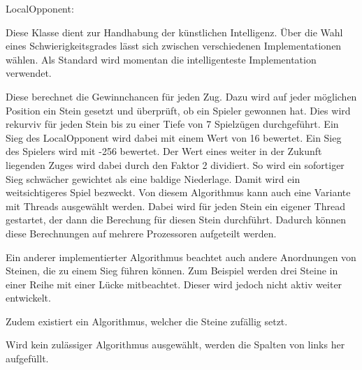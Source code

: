 LocalOpponent:

Diese Klasse dient zur Handhabung der künstlichen 
Intelligenz. Über die Wahl eines
Schwierigkeitsgrades lässt sich zwischen 
verschiedenen Implementationen wählen. Als Standard
wird momentan die intelligenteste Implementation 
verwendet.

Diese berechnet die Gewinnchancen für jeden Zug. 
Dazu wird auf jeder möglichen Position ein Stein
gesetzt und überprüft, ob ein Spieler gewonnen hat. 
Dies wird rekurviv für jeden Stein bis zu einer Tiefe 
von 7 Spielzügen durchgeführt. 
Ein Sieg des LocalOpponent wird dabei mit einem Wert 
von 16 bewertet. Ein Sieg des Spielers wird mit -256 
bewertet. 
Der Wert eines weiter in der Zukunft liegenden Zuges 
wird dabei durch den Faktor 2 dividiert. 
So wird ein sofortiger Sieg schwächer gewichtet als 
eine baldige Niederlage. Damit wird ein weitsichtigeres 
Spiel bezweckt. 
Von diesem Algorithmus kann auch eine Variante mit 
Threads ausgewählt werden. Dabei wird für jeden 
Stein ein eigener Thread gestartet, der dann die 
Berechung für diesen Stein durchführt. Dadurch 
können diese Berechnungen auf mehrere Prozessoren 
aufgeteilt werden. 

Ein anderer implementierter Algorithmus beachtet auch 
andere Anordnungen von Steinen, die zu einem Sieg 
führen können. Zum Beispiel werden drei Steine in 
einer Reihe mit einer Lücke mitbeachtet. Dieser wird 
jedoch nicht aktiv weiter entwickelt. 

Zudem existiert ein Algorithmus, welcher die Steine 
zufällig setzt. 

Wird kein zulässiger Algorithmus ausgewählt, werden 
die Spalten von links her aufgefüllt. 
